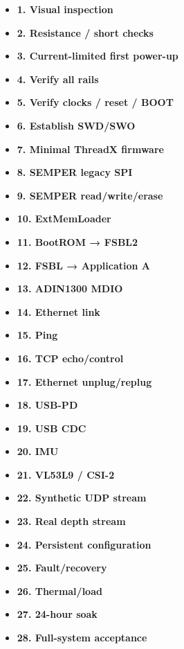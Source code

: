 \documentclass[10pt,a4paper,oneside]{report}
\providecommand{\tightlist}{\setlength{\itemsep}{1pt}\setlength{\parskip}{1pt}}
\begin{document}
\begin{itemize}
\tightlist
\item[$\square$]
  \textbf{1. Visual inspection}
\item[$\square$]
  \textbf{2. Resistance / short checks}
\item[$\square$]
  \textbf{3. Current-limited first power-up}
\item[$\square$]
  \textbf{4. Verify all rails}
\item[$\square$]
  \textbf{5. Verify clocks / reset / BOOT}
\item[$\square$]
  \textbf{6. Establish SWD/SWO}
\item[$\square$]
  \textbf{7. Minimal ThreadX firmware}
\item[$\square$]
  \textbf{8. SEMPER legacy SPI}
\item[$\square$]
  \textbf{9. SEMPER read/write/erase}
\item[$\square$]
  \textbf{10. ExtMemLoader}
\item[$\square$]
  \textbf{11. BootROM → FSBL2}
\item[$\square$]
  \textbf{12. FSBL → Application A}
\item[$\square$]
  \textbf{13. ADIN1300 MDIO}
\item[$\square$]
  \textbf{14. Ethernet link}
\item[$\square$]
  \textbf{15. Ping}
\item[$\square$]
  \textbf{16. TCP echo/control}
\item[$\square$]
  \textbf{17. Ethernet unplug/replug}
\item[$\square$]
  \textbf{18. USB-PD}
\item[$\square$]
  \textbf{19. USB CDC}
\item[$\square$]
  \textbf{20. IMU}
\item[$\square$]
  \textbf{21. VL53L9 / CSI-2}
\item[$\square$]
  \textbf{22. Synthetic UDP stream}
\item[$\square$]
  \textbf{23. Real depth stream}
\item[$\square$]
  \textbf{24. Persistent configuration}
\item[$\square$]
  \textbf{25. Fault/recovery}
\item[$\square$]
  \textbf{26. Thermal/load}
\item[$\square$]
  \textbf{27. 24-hour soak}
\item[$\square$]
  \textbf{28. Full-system acceptance}
\end{itemize}
\end{document}
